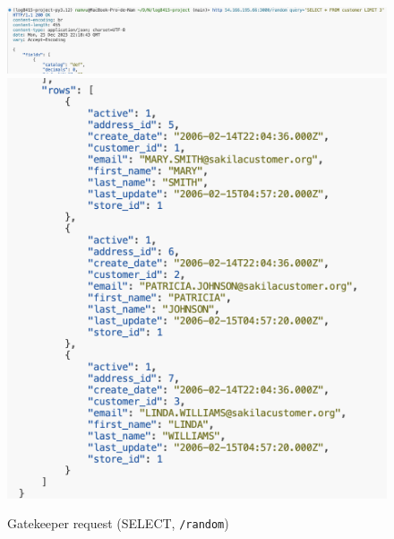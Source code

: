 \documentclass[letterpaper,headings=standardclasses,parskip=half]{scrartcl}
\begin{document}
\begin{figure}[h]
    \centering
    \includegraphics[width=\linewidth]{figures/Screenshot 2023-12-25 at 23.20.43.png}
    \includegraphics[width=0.75\linewidth]{figures/Screenshot 2023-12-25 at 23.20.52.png}
    \caption{Gatekeeper request (SELECT, \texttt{/random})}
    \label{fig:patterns_random}
\end{figure}
\end{document}
